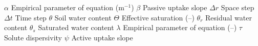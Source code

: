 {\vskip 10pt

\symb $\alpha$		Empirical parameter of \citeonline[genuchten80] equation (m$^{-1}$)
\symb $\beta$		Passive uptake slope \uwatflux
\symb $\Delta r$	Space step \uhead
\symb $\Delta t$	Time step \utime
\symb $\theta$		Soil water content \uwc
\symb $\Theta$		Effective saturation (--)
\symb $\theta_r$	Residual water content \uwc
\symb $\theta_s$	Saturated water content \uwc
\symb $\lambda$		Empirical parameter of \citeonline[genuchten80] equation (--)
\symb $\tau$		Solute dispersivity \uhead
\symb $\psi$		Active uptake slope \uwatflux

}

